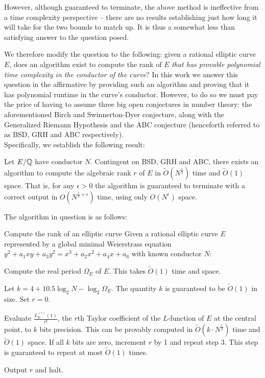\documentclass[10pt]{article}
\begin{document}
However, although guaranteed to terminate, the above method is ineffective from a time complexity perspective -- there are no results establishing just how long it will take for the two bounds to match up. It is thus a somewhat less than satisfying answer to the question posed.

We therefore modify the question to the following: given a rational elliptic curve $E$, does an algorithm exist to compute the rank of $E$ {\it that has provable polynomial time complexity in the conductor of the curve}? 
In this work we answer this question in the affirmative by providing such an algorithm and proving that it has polynomial runtime in the curve's conductor. However, to do so we must pay the price of having to assume three big open conjectures in number theory: the aforementioned Birch and Swinnerton-Dyer conjecture, along with the Generalized Riemann Hypothesis and the ABC conjecture (henceforth referred to as BSD, GRH and ABC respectively). \\

Specifically, we establish the following result:
\begin{theorem}\label{thm:main_theorem}
Let $E/\mathbb{Q}$ have conductor $N$. Contingent on BSD, GRH and ABC, there exists an algorithm to compute the algebraic rank $r$ of $E$ in $\tilde{O}(N^{\frac{1}{2}})$ time and $\tilde{O}(1)$ space. That is, for any $\epsilon>0$ the algorithm is guaranteed to terminate with a correct output in $O(N^{\frac{1}{2}+\epsilon})$ time, using only $O(N^{\epsilon})$ space.
\end{theorem}
The algorithm in question is as follows:
\begin{algorithm}{Compute the rank of an elliptic curve}\label{algo:compute_rank}
Given a rational elliptic curve $E$ represented by a global minimal Weierstrass equation $y^2 + a_1 xy + a_3 y^2 = x^3 + a_2 x^2 + a_4 x + a_6$ with known conductor $N$:
\begin{steps}
\item Compute the real period $\Omega_E$ of $E$. This takes $\tilde{O}(1)$ time and space.
\item Let $k = 4 + 10.5 \log_2 N - \log_2 \Omega_E$. The quantity $k$ is guaranteed to be $\tilde{O}(1)$ in size. Set $r=0$.
\item Evaluate $\frac{L_E^{(r)}(1)}{r!}$, the $r$th Taylor coefficient of the $L$-function of $E$ at the central point, to $k$ bits precision. This can be provably computed in $\tilde{O}(k\cdot N^{\frac{1}{2}})$ time and $\tilde{O}(1)$ space. If all $k$ bits are zero, increment $r$ by 1 and repeat step $3$. This step is guaranteed to repeat at most $\tilde{O}(1)$ 	times.
\item Output $r$ and halt.
\end{steps}
\end{algorithm}
\end{document}
